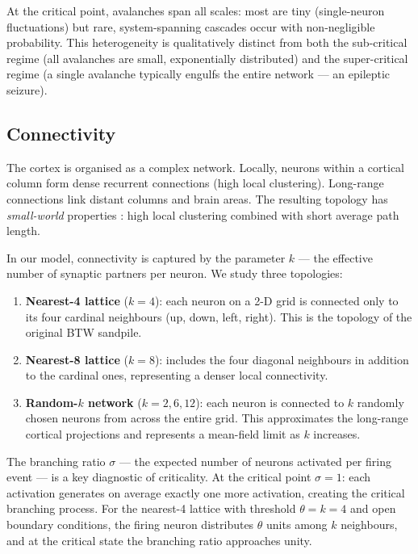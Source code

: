 \documentclass[12pt,a4paper]{article}
\begin{document}
At the critical point, avalanches span all scales: most are tiny
(single-neuron fluctuations) but rare, system-spanning cascades occur
with non-negligible probability.  This heterogeneity is qualitatively
distinct from both the sub-critical regime (all avalanches are small,
exponentially distributed) and the super-critical regime (a single
avalanche typically engulfs the entire network — an epileptic seizure).

\subsection{Connectivity}

The cortex is organised as a complex network.  Locally,
neurons within a cortical column form dense recurrent connections
(high local clustering).  Long-range connections link distant columns
and brain areas.  The resulting topology has \emph{small-world}
properties \cite{watts1998}: high local clustering combined with short
average path length.

In our model, connectivity is captured by the parameter $k$ — the
effective number of synaptic partners per neuron.  We study three
topologies:
\begin{enumerate}
  \item \textbf{Nearest-4 lattice} ($k=4$): each neuron on a 2-D grid is
        connected only to its four cardinal neighbours (up, down, left,
        right).  This is the topology of the original BTW sandpile.
  \item \textbf{Nearest-8 lattice} ($k=8$): includes the four diagonal
        neighbours in addition to the cardinal ones, representing a
        denser local connectivity.
  \item \textbf{Random-$k$ network} ($k = 2, 6, 12$): each neuron is
        connected to $k$ randomly chosen neurons from across the entire
        grid.  This approximates the long-range cortical projections and
        represents a mean-field limit as $k$ increases.
\end{enumerate}

The branching ratio $\sigma$ — the expected number of neurons activated
per firing event — is a key diagnostic of criticality.  At the critical
point $\sigma = 1$: each activation generates on average exactly one
more activation, creating the critical branching process.  For the
nearest-4 lattice with threshold $\theta = k = 4$ and open boundary
conditions, the firing neuron distributes $\theta$ units among $k$
neighbours, and at the critical state the branching ratio approaches
unity.
\end{document}
